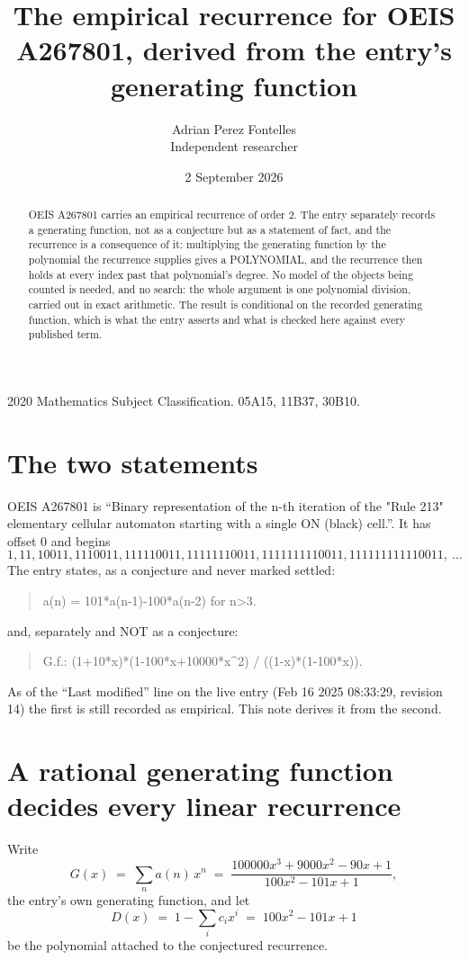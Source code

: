 \documentclass[11pt,a4paper]{article}
\title{The empirical recurrence for OEIS A267801, derived from the entry's generating function}
\author{Adrian Perez Fontelles\\ \small Independent researcher}
\date{2 September 2026}
\theoremstyle{plain}
\theoremstyle{definition}
\begin{document}
\maketitle

\begin{abstract}
OEIS A267801 carries an empirical recurrence of order $2$. The entry separately records a
generating function, not as a conjecture but as a statement of fact, and the recurrence is a
consequence of it: multiplying the generating function by the polynomial the recurrence
supplies gives a POLYNOMIAL, and the recurrence then holds at every index past that
polynomial's degree. No model of the objects being counted is needed, and no search: the
whole argument is one polynomial division, carried out in exact arithmetic. The result is
conditional on the recorded generating function, which is what the entry asserts and what is
checked here against every published term.
\end{abstract}

\noindent\small 2020 Mathematics Subject Classification. 05A15, 11B37, 30B10.\normalsize

\section{The two statements}

OEIS A267801 is ``Binary representation of the n-th iteration of the "Rule 213" elementary cellular automaton starting with a single ON (black) cell.''. It has offset $0$ and begins
\[
1, 11, 10011, 1110011, 111110011, 11111110011, 1111111110011, 111111111110011,\ \dots
\]
The entry states, as a conjecture and never marked settled:
\begin{quote}
a(n) = 101*a(n-1)-100*a(n-2) for n>3.
\end{quote}
and, separately and NOT as a conjecture:
\begin{quote}
G.f.: (1+10*x)*(1-100*x+10000*x\^{}2) / ((1-x)*(1-100*x)).
\end{quote}
As of the ``Last modified'' line on the live entry (Feb 16 2025 08:33:29, revision 14) the first is still
recorded as empirical. This note derives it from the second.

\section{A rational generating function decides every linear recurrence}

Write
\[
G(x)\;=\;\sum_{n}a(n)\,x^{n}\;=\;\frac{100000 x^{3} + 9000 x^{2} - 90 x + 1}{100 x^{2} - 101 x + 1},
\]
the entry's own generating function, and let
\[
D(x)\;=\;1-\sum_i c_i x^{i}\;=\;100 x^{2} - 101 x + 1
\]
be the polynomial attached to the conjectured recurrence.
\end{document}
